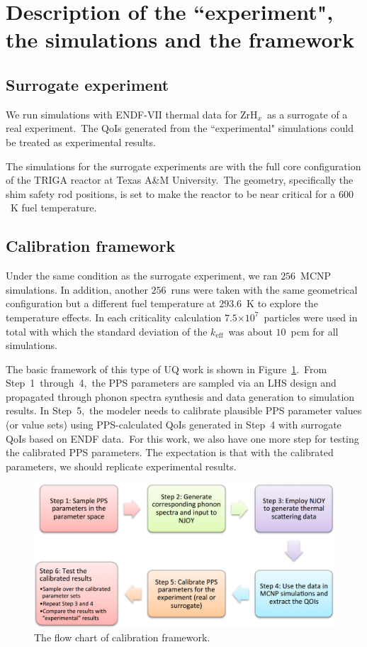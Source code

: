 \documentclass[review]{elsarticle}
\newcommand{\zh}{ZrH$_x$}
\newcommand{\e}[1]{\ensuremath{\times 10^{#1}}}
\newcommand{\TAMU}{Texas A\&M University}
\begin{document}
\section{Description of the ``experiment", the simulations and the framework}
\subsection{Surrogate experiment}
We run simulations with ENDF-VII thermal data for \zh~as a surrogate of a real experiment.~The QoIs generated from the ``experimental" simulations could be treated as experimental results.

The simulations for the surrogate experiments are with the full core configuration of the TRIGA reactor at \TAMU.~The geometry, specifically the shim safety rod positions, is set to make the reactor to be near critical for a $600$~K fuel temperature.
\subsection{{Calibration framework}}
{Under the same condition as the surrogate experiment, }we ran $256$\ MCNP simulations. In addition, another $256$~runs were taken with the same geometrical configuration but a different fuel temperature at $293.6$~K to explore the temperature effects. In each criticality calculation $7.5\e{7}$~particles were used in total with which the standard deviation of the $k_\mathrm{eff}$~was  about $10$~pcm for all simulations.

The basic framework of this type of UQ work is shown in Figure~\ref{fg:fc}.~From Step~1~through~4,~the PPS parameters are sampled via an LHS design and propagated through phonon spectra synthesis and data generation to simulation results. In Step~5,~the modeler needs to calibrate plausible PPS parameter values (or value sets) {using PPS-calculated QoIs generated in Step~4 with surrogate QoIs based on ENDF data}.~For this work, we also have one more step for testing the calibrated PPS parameters. The expectation is that with the calibrated parameters, we should replicate experimental results.

\begin{figure}[ht!]
  \begin{center}
    \hspace*{-1.2cm}\includegraphics[width=1.2\textwidth]{NSE15-48R1_Figure3.pdf}
    \caption[]{\label{fg:fc}The flow chart of calibration framework.}%
  \end{center}
\end{figure}
\end{document}

